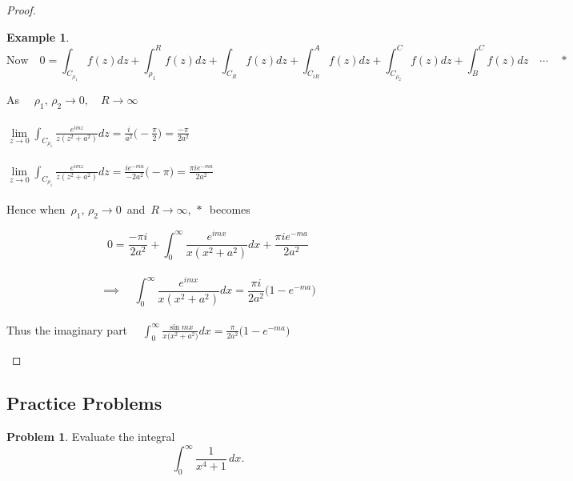 \documentclass[11pt,a4paper]{article}
\theoremstyle{definition}
\newtheorem{example}[thm]{Example}
\newtheorem{problemx}{Problem}[section]
\newenvironment{problem}{\begin{problemx}}{\end{problemx}}
\begin{document}
\begin{proof}
\begin{example}
$$\text{Now}\quad  0 = \int_{C_{\rho_1}} f(z)dz + \int^R_{\rho_1} f(z)dz +  \int_{C_R} f(z)dz + \int^A_{C_{iR}} f(z)dz + \int^C_{C_{\rho_2}} f(z)dz +  \int^C_{B} f(z)dz \quad  \cdots\quad *$$ 



As $\quad  \rho_1,\, \rho_2 \longrightarrow 0,\quad  R\longrightarrow \infty$\\\\

$\displaystyle{\lim\limits_{z\longrightarrow 0}\int_{C_{\rho_1}} \frac{e^{imz}}{z (z^2 + a^2)}dz = \frac{i}{a^2}\Big(-\frac{\pi}{2}\Big) = \frac{-\pi}{2a^2}}$\\\\


$\displaystyle{\lim\limits_{z\longrightarrow 0}\int_{C_{\rho_1}} \frac{e^{imz}}{z (z^2 + a^2)}dz = \frac{ie^{-ma}}{-2a^2}\big(-\pi\big) = \frac{\pi ie^{-ma}}{2a^2}}$\\\\



Hence when $\,\rho_1,\,\rho_2 \longrightarrow 0\,$ and $\, R\longrightarrow \infty,\, *\,$ becomes

$$ 0 = \frac{-\pi i}{2a^2} + \int^{\infty}_0\frac{e^{imx}}{x(x^2 + a^2)}dx + \frac{\pi i e^{-ma}}{2a^2}$$ \\

$$\implies \quad \int^{\infty}_0\frac{e^{imx}}{x(x^2 + a^2)}dx = \frac{\pi i}{2a^2}\Big(1 - e^{-ma}\Big)$$\\





Thus the imaginary part $\quad  \displaystyle{\int^{\infty}_0 \frac{\sin mx }{x \big(x^2 + a^2\big)}dx = \frac{\pi}{2a^2}\Big(1 - e^{-ma}\Big)}$
\end{example}
\end{proof}

{\color[wave]{485}\subsection{Practice Problems}}

\begin{problem}
Evaluate the integral
$$\int^{\infty}_{0}\frac{1}{x^{4} + 1}\,dx .$$
\end{problem}
\end{document}
